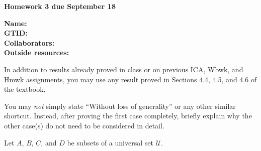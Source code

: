 \documentclass[11pt]{article}
\begin{document}
{\noindent\Large\textbf{Homework 3 due September 18}}

\vspace{.25in}

{\large
\noindent
\textbf{Name:} \smallskip \\
\textbf{GTID:} \smallskip \\
\textbf{Collaborators:} \smallskip \\
\textbf{Outside resources:} \smallskip \\
}

\pagebreak

\smallskip

\noindent
In addition to results already proved in class or on previous ICA, Wbwk, 
and Hmwk assignments,
you may use any result proved in Sections 4.4, 4.5, and 4.6 of the textbook.

\smallskip

\noindent
You may \emph{not} simply state ``Without loss of generality'' or any 
other similar shortcut.
Instead, after proving the first case completely, 
briefly explain why the other case(s) do not need to be 
considered in detail.

\bigskip

\noindent
Let $A$, $B$, $C$, and $D$ be subsets of a universal set $\mathcal{U}$.

\smallskip
\end{document}
